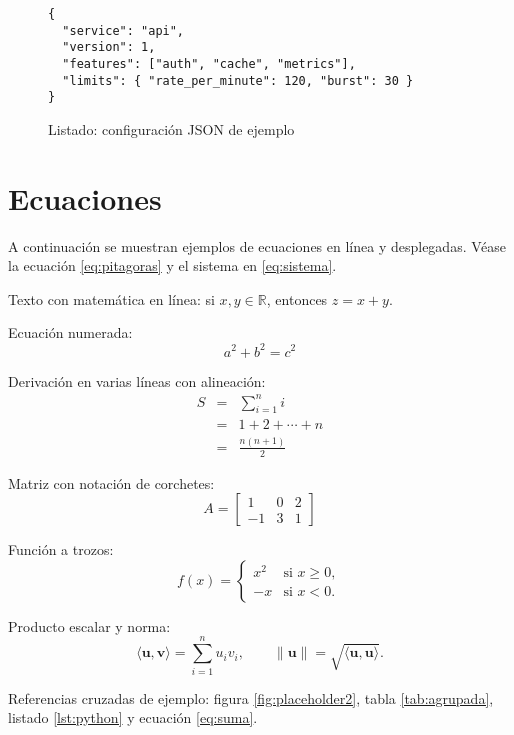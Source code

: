 \begin{figure}[htbp]
  \centering
  \begin{minipage}{0.95\linewidth}
\begin{verbatim}
{
  "service": "api",
  "version": 1,
  "features": ["auth", "cache", "metrics"],
  "limits": { "rate_per_minute": 120, "burst": 30 }
}
\end{verbatim}
  \end{minipage}
  \caption{Listado: configuración JSON de ejemplo}
  \label{lst:json}
\end{figure}

\section{Ecuaciones}
A continuación se muestran ejemplos de ecuaciones en línea y desplegadas. Véase la ecuación \ref{eq:pitagoras} y el sistema en \ref{eq:sistema}.

Texto con matemática en línea: si $x, y \in \mathbb{R}$, entonces $z = x + y$.

Ecuación numerada:
\begin{equation}
  a^2 + b^2 = c^2
  \label{eq:pitagoras}
\end{equation}

Derivación en varias líneas con alineación:
\begin{eqnarray}
  S &=& \sum_{i=1}^{n} i \\
  &=& 1 + 2 + \cdots + n \\
  &=& \frac{n(n+1)}{2} \label{eq:suma}
\end{eqnarray}

Matriz con notación de corchetes:
\[
  A = \left[
    \begin{array}{ccc}
      1 & 0 & 2 \\
      -1 & 3 & 1
    \end{array}
  \right]
\]

Función a trozos:
\[
  f(x) = \left\{
    \begin{array}{ll}
      x^2 & \mbox{si } x \ge 0, \\
      -x  & \mbox{si } x < 0.
    \end{array}
    \right.
    \label{eq:sistema}
  \]

  Producto escalar y norma:
  \[
    \langle \mathbf{u}, \mathbf{v} \rangle = \sum_{i=1}^{n} u_i v_i,
    \qquad
    \|\mathbf{u}\| = \sqrt{\langle \mathbf{u}, \mathbf{u} \rangle }.
  \]

  Referencias cruzadas de ejemplo: figura \ref{fig:placeholder2}, tabla \ref{tab:agrupada}, listado \ref{lst:python} y ecuación \ref{eq:suma}.
